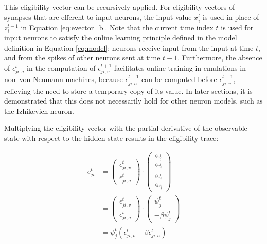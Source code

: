             This eligibility vector can be recursively applied.
            For eligibility vectors of synapses that are efferent to input neurons, the input value $x^t_i$ is used in place of $z_i^{t-1}$ in Equation \ref{eq:evector_b}.
            Note that the current time index $t$ is used for input neurons to satisfy the online learning principle defined in the model definition in Equation \ref{eq:model}; neurons receive input from the input at time $t$, and from the spikes of other neurons sent at time $t-1$.
            Furthermore, the absence of $\epsilon_{ji, a}^t$ in the computation of $\epsilon_{ji, v}^{t+1}$ facilitates online training in emulations in non--von Neumann machines, because $\epsilon_{ji, a}^{t+1}$ can be computed before $\epsilon_{ji, v}^{t+1}$, relieving the need to store a temporary copy of its value.
            In later sections, it is demonstrated that this does not necessarily hold for other neuron models, such as the Izhikevich neuron.

            Multiplying the eligibility vector with the partial derivative of the observable state with respect to the hidden state results in the eligibility trace:

            \begin{align}
            e^t_{ji} &= \begin{pmatrix}
            \epsilon_{ji, v}^t\\
            \epsilon_{ji, a}^t
            \end{pmatrix}
            \cdot
            \begin{pmatrix}
            \frac{\partial z^t_j}{\partial v^t_j}\\
            \frac{\partial z^t_j}{\partial a^t_j}
            \end{pmatrix}\\
            &= \begin{pmatrix}
            \epsilon_{ji, v}^t\\
            \epsilon_{ji, a}^t
            \end{pmatrix}
            \cdot
            \begin{pmatrix}
            \psi^t_j\\
            -\beta\psi^t_j
            \end{pmatrix}\\
            &= \psi^t_j\left(\epsilon_{ji, v}^t - \beta\epsilon_{ji, a}^t\right)
            \end{align}

